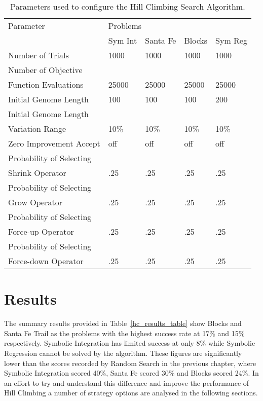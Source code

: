 \begin{table}[h]
\begin{center}
\begin{tabular}{|l|l|l|l|l|}
\hline
Parameter &\multicolumn{4}{l|}{Problems}\\
\cline{2-1} \cline{3-1} \cline{4-1} \cline{5-1} 
 & Sym Int & Santa Fe & Blocks & Sym Reg  \\
\hline
Number of Trials & 1000 & 1000 & 1000 & 1000 \\
Number of Objective & & & & \\ 
Function Evaluations  & 25000 & 25000 & 25000 & 25000  \\
Initial Genome Length & 100 & 100 & 100 & 200  \\
Initial Genome Length & & & &  \\
Variation Range  & 10\% & 10\% & 10\% & 10\%  \\
Zero Improvement Accept  & off & off & off & off  \\
Probability of Selecting & & & & \\
Shrink Operator  & .25 & .25 & .25 & .25  \\
Probability of Selecting & & & & \\
Grow Operator  & .25 & .25 & .25 & .25  \\
Probability of Selecting & & & & \\
Force-up Operator  & .25 & .25 & .25 & .25 \\
Probability of Selecting & & & & \\
Force-down Operator  & .25 & .25 & .25 & .25  \\
\hline
\end{tabular}
\caption{\label{hc_param_table} Parameters used to configure the Hill Climbing Search Algorithm.}
\end{center}
\end{table}




\section{Results}
The summary results provided in Table~\ref{hc_results_table} show Blocks and Santa Fe Trail as the problems with the highest success rate at 17\% and 15\% respectively. Symbolic Integration has limited success at only 8\% while Symbolic Regression cannot be solved by the algorithm. These figures are significantly lower than the scores recorded by Random Search in the previous chapter, where Symbolic Integration scored 40\%, Santa Fe scored 30\% and Blocks scored 24\%. In an effort to try and understand this difference and improve the performance of Hill Climbing a number of strategy options are analysed in the following sections.


